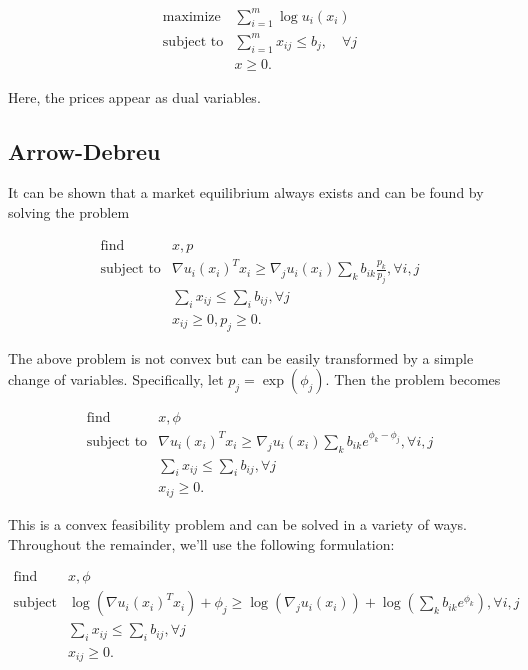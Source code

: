 \documentclass{article}
\begin{document}
\[
\begin{array}{ll}
\mbox{maximize} & \sum_{i=1}^m \log u_i(x_i) \\
\mbox{subject to} & \sum_{i=1}^m x_{ij} \leq b_j, \quad \forall j\\
& x \geq 0.
\end{array}
\]

Here, the prices appear as dual variables.

\subsection{Arrow-Debreu}
It can be shown that a market equilibrium always exists and can be found by solving the problem

\[
\begin{array}{ll}
\mbox{find} & x, p \\
\mbox{subject to} & \nabla u_i(x_i)^T x_i \geq  \nabla_j u_i(x_i) \sum_k b_{ik} \frac{p_k}{p_j}, \forall i,j\\
& \sum_i x_{ij} \leq \sum_i b_{ij}, \forall j\\
& x_{ij} \geq 0, p_j \geq 0.
\end{array}
\]


The above problem is not convex but can be easily transformed by a simple change of variables. Specifically, let $p_j = \exp(\phi_j)$.
Then the problem becomes

\[
\begin{array}{ll}
\mbox{find} & x, \phi \\
\mbox{subject to} & \nabla u_i(x_i)^T x_i \geq  \nabla_j u_i(x_i) \sum_k b_{ik} e^{\phi_k - \phi_j}, \forall i,j\\
& \sum_i x_{ij} \leq \sum_i b_{ij}, \forall j\\
& x_{ij} \geq 0.
\end{array}
\]

This is a convex feasibility problem and can be solved in a variety of ways.
Throughout the remainder, we'll use the following formulation:

\[
\begin{array}{ll}
\mbox{find} & x, \phi \\
\mbox{subject to} & \log(\nabla u_i(x_i)^T x_i) + \phi_j \geq  \log(\nabla_j u_i(x_i)) +  \log(\sum_k b_{ik} e^{\phi_k}), \forall i,j\\
& \sum_i x_{ij} \leq \sum_i b_{ij}, \forall j\\
& x_{ij} \geq 0.
\end{array}
\]
\end{document}
